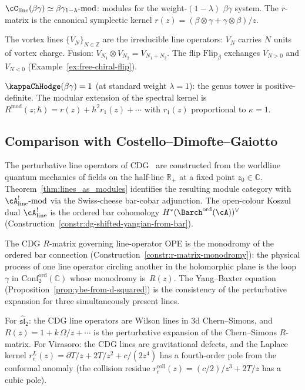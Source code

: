 \begin{computation}
\label{comp:line-op-betagamma}
$\cC_{\mathrm{line}}(\beta\gamma)
\simeq\beta\gamma_{1-\lambda}\text{-mod}$:
modules for the weight-$(1{-}\lambda)$ $\beta\gamma$ system.
The $r$-matrix is the canonical symplectic kernel
$r(z)=(\beta\otimes\gamma+\gamma\otimes\beta)/z$.

The vortex lines $\{V_N\}_{N\in\mathbb Z}$ are the
irreducible line operators: $V_N$ carries $N$ units of
vortex charge. Fusion: $V_{N_1}\otimes V_{N_2}=V_{N_1+N_2}$.
The flip $\mathrm{Flip}_\beta$ exchanges $V_{N>0}$ and
$V_{N<0}$ (Example~\ref{ex:free-chiral-flip}).

$\kappaChHodge(\beta\gamma)=1$ (at standard weight $\lambda=1$): the genus tower
is positive-definite. The modular extension of the spectral kernel is
$R^{\mathrm{mod}}(z;\hbar)=r(z)+\hbar^2 r_1(z)+\cdots$
with $r_1(z)$ proportional to $\kappa=1$.
\end{computation}

\subsection{Comparison with Costello--Dimofte--Gaiotto}
\label{subsec:cdg-comparison}

\begin{remark}[CDG line operators = ordered bar cohomology modules]
\label{rem:cdg-comparison}
The perturbative line operators of CDG~\cite{CDG20} are
constructed from the worldline quantum mechanics of fields
on the half-line $\mathbb R_+$ at a fixed point $z_0\in\mathbb C$.
Theorem~\ref{thm:lines_as_modules} identifies the resulting
module category with $\cA^!_{\mathrm{line}}\text{-mod}$ via the
Swiss-cheese bar-cobar adjunction. The open-colour Koszul dual
$\cA^!_{\mathrm{line}}$ is the
ordered bar cohomology
$H^*({\Barch}^{\mathrm{ord}}(\cA))^\vee$
(Construction~\ref{constr:dg-shifted-yangian-from-bar}).

The CDG $R$-matrix governing line-operator OPE is the
monodromy of the ordered bar connection
(Construction~\ref{constr:r-matrix-monodromy}):
the physical process of one line operator circling another
in the holomorphic plane is the loop $\gamma$ in
$\mathrm{Conf}_2^{\mathrm{ord}}(\mathbb C)$ whose monodromy
is~$R(z)$. The Yang--Baxter equation
(Proposition~\ref{prop:ybe-from-d-squared}) is the
consistency of the perturbative expansion for three
simultaneously present lines.

For $\widehat{\mathfrak{sl}}_2$: the CDG line operators are
Wilson lines in 3d Chern--Simons, and $R(z)=1+k\,\Omega/z+\cdots$
is the perturbative expansion of the Chern--Simons $R$-matrix.
For Virasoro: the CDG lines are gravitational defects, and
the Laplace kernel $r^L_c(z)=\partial T/z+2T/z^2+c/(2z^4)$ has a
fourth-order pole from the conformal anomaly (the collision residue
$r^{\mathrm{coll}}_c(z) = (c/2)/z^3 + 2T/z$ has a cubic pole).
\end{remark}

